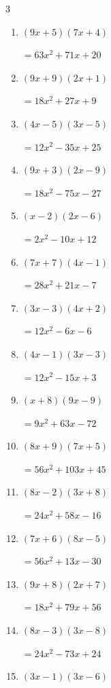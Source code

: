 \begin{multicols}{3}
\begin{enumerate}
        $=6x^{2}+60x+54$

\columnbreak %

  \item $(9x+5)(7x+4)$

        $=63x^{2}+71x+20$

  \item $(9x+9)(2x+1)$

        $=18x^{2}+27x+9$

  \item $(4x-5)(3x-5)$

        $=12x^{2}-35x+25$

  \item $(9x+3)(2x-9)$

        $=18x^{2}-75x-27$

  \item $(x-2)(2x-6)$

        $=2x^{2}-10x+12$

  \item $(7x+7)(4x-1)$

        $=28x^{2}+21x-7$

  \item $(3x-3)(4x+2)$

        $=12x^{2}-6x-6$

  \item $(4x-1)(3x-3)$

        $=12x^{2}-15x+3$

  \item $(x+8)(9x-9)$

        $=9x^{2}+63x-72$

  \item $(8x+9)(7x+5)$

        $=56x^{2}+103x+45$

  \item $(8x-2)(3x+8)$

        $=24x^{2}+58x-16$

  \item $(7x+6)(8x-5)$

        $=56x^{2}+13x-30$

  \item $(9x+8)(2x+7)$

        $=18x^{2}+79x+56$

  \item $(8x-3)(3x-8)$

        $=24x^{2}-73x+24$

  \item $(3x-1)(3x-6)$


\end{enumerate}
\end{multicols}
